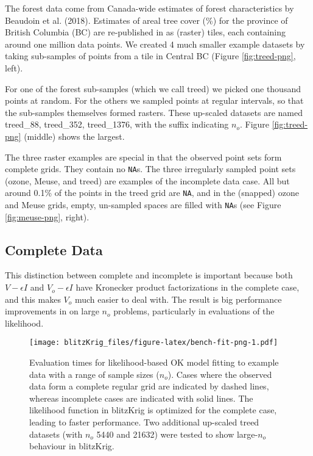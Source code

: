 The forest data come from Canada-wide estimates of forest characteristics by Beaudoin et al. (2018). Estimates of areal tree cover (\%) for the province of British Columbia (BC) are re-published in  as (raster) tiles, each containing around one million data points. We created 4 much smaller example datasets by taking sub-samples of points from a tile in Central BC (Figure \ref{fig:treed-png}, left).

For one of the forest sub-samples (which we call treed) we picked one thousand points at random. For the others we sampled points at regular intervals, so that the sub-samples themselves formed rasters. These up-scaled datasets are named treed\_88, treed\_352, treed\_1376, with the suffix indicating \(n_o\). Figure \ref{fig:treed-png} (middle) shows the largest.

The three raster examples are special in that the observed point sets form complete grids. They contain no \texttt{NA}s. The three irregularly sampled point sets (ozone, Meuse, and treed) are examples of the incomplete data case. All but around 0.1\% of the points in the treed grid are \texttt{NA}, and in the (snapped) ozone and Meuse grids, empty, un-sampled spaces are filled with \texttt{NA}s (see Figure \ref{fig:meuse-png}, right).

\hypertarget{complete-data}{%
\subsection{Complete Data}\label{complete-data}}

This distinction between complete and incomplete is important because both \(V - \epsilon I\) and \(V_o - \epsilon I\) have Kronecker product factorizations in the complete case, and this makes \(V_o\) much easier to deal with. The result is big performance improvements in  on large \(n_o\) problems, particularly in evaluations of the likelihood.

\begin{figure}
\centering
\texttt{[image: blitzKrig\_files/figure-latex/bench-fit-png-1.pdf]}
\caption{\label{fig:bench-fit-png}Evaluation times for likelihood-based OK model fitting to example data with a range of sample sizes (\(n_o\)). Cases where the observed data form a complete regular grid are indicated by dashed lines, whereas incomplete cases are indicated with solid lines. The likelihood function in blitzKrig is optimized for the complete case, leading to faster performance. Two additional up-scaled treed datasets (with \(n_o\) 5440 and 21632) were tested to show large-\(n_o\) behaviour in blitzKrig.}
\end{figure}

